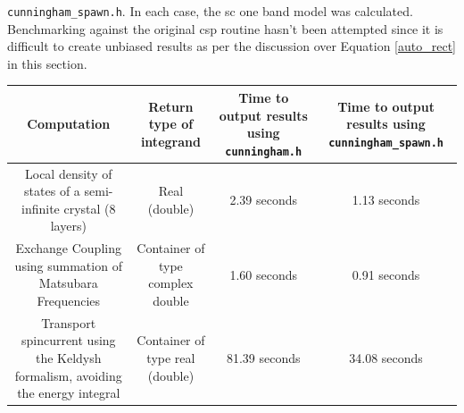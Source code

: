 \documentclass[a4paper, 12pt]{article}
\begin{document}
{\tt cunningham\_spawn.h}. In each case, the \gls{sc} one band model was calculated. Benchmarking against the original \acrfull{csp} routine hasn't been attempted since it is difficult to create unbiased results as per the discussion over Equation \eqref{auto_rect} in this section.
\footnotesize
\begin{center}
\begin{tabular}{cccc}\toprule
	Computation& \parbox{3cm}{\centering Return type of integrand}& \parbox{3cm}{\centering Time to output results using {\scriptsize\tt cunningham.h}}& \parbox{3cm}{\centering Time to output results using {\scriptsize\tt cunningham\_spawn.h}}\\
\midrule
\parbox{3cm}{\centering Local density of states of a semi-infinite crystal (8 layers)}& Real (double)& 2.39 seconds& 1.13 seconds\\[1cm]
\parbox{3cm}{\centering Exchange Coupling using summation of Matsubara Frequencies}& \parbox{3cm}{\centering Container of type complex double}& 1.60 seconds& 0.91 seconds\\[1cm]
\parbox{3cm}{\centering Transport spincurrent using the Keldysh formalism, avoiding the energy integral}& \parbox{3cm}{\centering Container of type real (double)}& 81.39 seconds& 34.08 seconds\\
\bottomrule
\end{tabular}
\end{center}

\normalsize
\begingroup
\let\clearpage\relax


\endgroup
\end{document}

